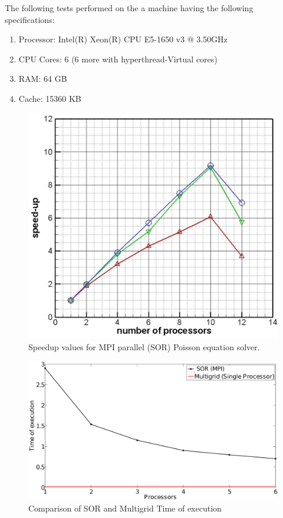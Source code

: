 The following tests performed on the a machine having the following specifications:

\begin{enumerate}
 \item Processor:  Intel(R) Xeon(R) CPU E5-1650 v3 @ 3.50GHz
 \item CPU Cores: 6 (6 more with hyperthread-Virtual cores)
 \item RAM:	 64 GB
 \item Cache:    15360 KB
\end{enumerate}

\begin{figure}
\begin{center}
\includegraphics[width=5.0 in]{speedup.eps}
\end{center}
\caption{Speedup values for MPI parallel (SOR) Poisson equation solver.}
\label{speedup} 
\end{figure}

\begin{figure}
\centering
 \includegraphics[scale=0.25]{comparison.eps} 
 \caption{Comparison of SOR and Multigrid Time of execution}
 \label{comparison_mg}
\end{figure}


